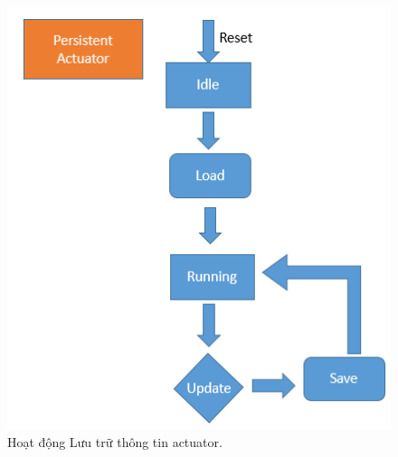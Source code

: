 \documentclass[a4paper,12pt,oneside]{article}
\begin{document}
\begin{itemize}
\begin{itemize}
\begin{center}
\begin{figure}[h!]
\begin{center}
\includegraphics[scale=.6]{hinh/persistent_actuator.PNG}
\end{center}
\caption{Hoạt động Lưu trữ thông tin actuator.}
\end{figure}
\end{center}
	
	\end{itemize}

\end{itemize}


  
\end{document}
